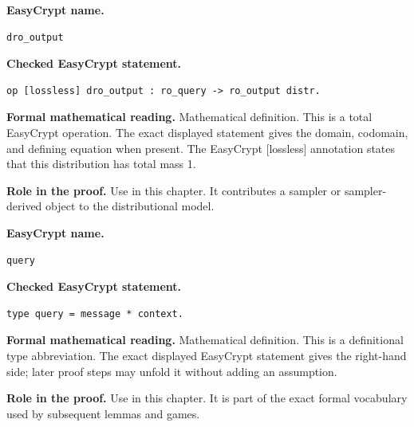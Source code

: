 \begin{formaldefinition}
\noindent\textbf{EasyCrypt name.}
\begin{lstlisting}[language=EasyCrypt,basicstyle=\ttfamily\scriptsize]
dro_output
\end{lstlisting}
\noindent\textbf{Checked EasyCrypt statement.}
\begin{lstlisting}[language=EasyCrypt,basicstyle=\ttfamily\scriptsize]
op [lossless] dro_output : ro_query -> ro_output distr.
\end{lstlisting}
\noindent\textbf{Formal mathematical reading.}
Mathematical definition. This is a total EasyCrypt operation.  The exact displayed statement gives the domain, codomain, and defining equation when present.  The EasyCrypt [lossless] annotation states that this distribution has total mass 1.

\noindent\textbf{Role in the proof.}
Use in this chapter. It contributes a sampler or sampler-derived object to the distributional model.

\end{formaldefinition}

\begin{formaldefinition}
\noindent\textbf{EasyCrypt name.}
\begin{lstlisting}[language=EasyCrypt,basicstyle=\ttfamily\scriptsize]
query
\end{lstlisting}
\noindent\textbf{Checked EasyCrypt statement.}
\begin{lstlisting}[language=EasyCrypt,basicstyle=\ttfamily\scriptsize]
type query = message * context.
\end{lstlisting}
\noindent\textbf{Formal mathematical reading.}
Mathematical definition. This is a definitional type abbreviation.  The exact displayed EasyCrypt statement gives the right-hand side; later proof steps may unfold it without adding an assumption.

\noindent\textbf{Role in the proof.}
Use in this chapter. It is part of the exact formal vocabulary used by subsequent lemmas and games.

\end{formaldefinition}

